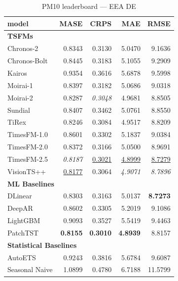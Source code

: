 \begin{table}[H]
\caption{PM10 leaderboard --- EEA DE}
\centering
\begin{small}
\begin{tabular}{lrrrr}
\toprule
model & MASE & CRPS & MAE & RMSE \\
\midrule
\multicolumn{5}{l}{\textbf{TSFMs}} \\
Chronos-2 & 0.8343 & 0.3130 & 5.0470 & 9.1636 \\
Chronos-Bolt & 0.8445 & 0.3183 & 5.1055 & 9.2909 \\
Kairos & 0.9354 & 0.3616 & 5.6878 & 9.5998 \\
Moirai-1 & 0.8397 & 0.3182 & 5.0686 & 9.0318 \\
Moirai-2 & 0.8287 & \textit{0.3048} & 4.9681 & 8.8505 \\
Sundial & 0.8407 & 0.3462 & 5.0761 & 8.8550 \\
TiRex & 0.8246 & 0.3084 & 4.9517 & 8.8209 \\
TimesFM-1.0 & 0.8601 & 0.3302 & 5.1837 & 9.0384 \\
TimesFM-2.0 & 0.8372 & 0.3166 & 5.0500 & 8.9691 \\
TimesFM-2.5 & \textit{0.8187} & \underline{0.3021} & \underline{4.8999} & \underline{8.7279} \\
VisionTS++ & \underline{0.8177} & 0.3064 & \textit{4.9071} & \textit{8.7896} \\
\midrule
\multicolumn{5}{l}{\textbf{ML Baselines}} \\
DLinear & 0.8303 & 0.3163 & 5.0137 & \textbf{8.7273} \\
DeepAR & 0.8602 & 0.3305 & 5.2019 & 9.1086 \\
LightGBM & 0.9093 & 0.3527 & 5.5419 & 9.4463 \\
PatchTST & \textbf{0.8155} & \textbf{0.3010} & \textbf{4.8939} & 8.8157 \\
\midrule
\multicolumn{5}{l}{\textbf{Statistical Baselines}} \\
AutoETS & 0.9243 & 0.3816 & 5.6784 & 9.6087 \\
Seasonal Naive & 1.0899 & 0.4780 & 6.7188 & 11.5799 \\
\bottomrule
\end{tabular}
\end{small}
\end{table}